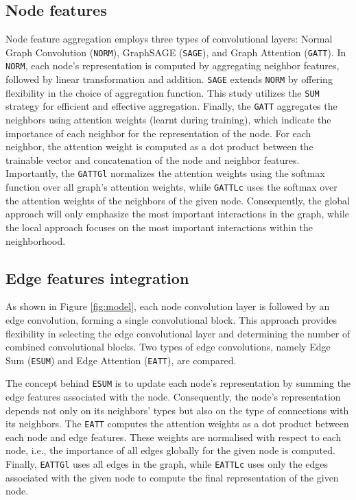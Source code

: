 \documentclass[10pt,twocolumn]{article}
\begin{document}
\subsection{Node features}
Node feature aggregation employs three types of convolutional layers: 
Normal Graph Convolution (\texttt{NORM}), GraphSAGE (\texttt{SAGE}), 
and Graph Attention (\texttt{GATT}). In \texttt{NORM}, each node's representation 
is computed by aggregating neighbor features, followed by linear transformation and addition.
\texttt{SAGE} extends \texttt{NORM} by offering flexibility in the choice of aggregation function. 
This study utilizes the \texttt{SUM} strategy for efficient and effective aggregation.
Finally, the \texttt{GATT} aggregates the neighbors using attention weights (learnt during training), 
which indicate the importance of each neighbor for the representation of the node. For each neighbor,
the attention weight is computed as a dot product between the trainable vector and concatenation of
the node and neighbor features. Importantly, the \texttt{GATTGl} normalizes the attention weights
using the softmax function over all graph's attention weights, while \texttt{GATTLc} uses the softmax
over the attention weights of the neighbors of the given node. Consequently, the global approach
will only emphasize the most important interactions in the graph, while the local approach focuses
on the most important interactions within the neighborhood.

\subsection{Edge features integration}
As shown in Figure \ref{fig:model}, each node convolution layer is followed by 
an edge convolution, forming a single convolutional block. 
This approach provides flexibility in selecting the edge convolutional layer 
and determining the number of combined convolutional blocks. 
Two types of edge convolutions, namely Edge Sum (\texttt{ESUM}) and Edge Attention (\texttt{EATT}), are compared.

The concept behind \texttt{ESUM} is to update each node's representation by summing the edge features 
associated with the node. Consequently, the node's representation depends not only on its neighbors' types but also on the 
type of connections with its neighbors. The \texttt{EATT} computes the attention weights
as a dot product between each node and edge features. These weights are normalised with respect to 
each node, i.e., the importance of all edges globally for the given node is computed. Finally, \texttt{EATTGl} uses
all edges in the graph, while \texttt{EATTLc} uses only the edges associated with the given node to compute 
the final representation of the given node.
\end{document}
